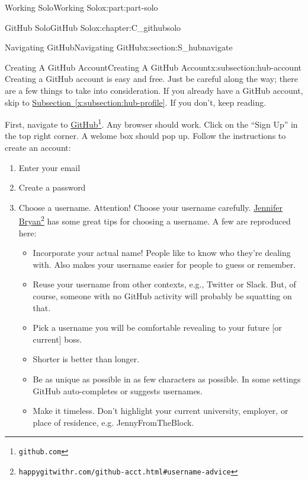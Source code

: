 \documentclass[oneside,10pt,]{book}
\newcommand{\xreffont}{\relax}
\begin{document}
\begin{partptx}{Working Solo}{}{Working Solo}{}{}{x:part:part-solo}
\begin{chapterptx}{GitHub Solo}{}{GitHub Solo}{}{}{x:chapter:C_githubsolo}
\begin{sectionptx}{Navigating GitHub}{}{Navigating GitHub}{}{}{x:section:S_hubnavigate}
\begin{introduction}{}
\end{introduction}%
%
%
\typeout{************************************************}
\typeout{************************************************}
%
\begin{subsectionptx}{Creating A GitHub Account}{}{Creating A GitHub Account}{}{}{x:subsection:hub-account}
%
%
Creating a GitHub account is easy and free. Just be careful along the way; there are a few things to take into consideration. If you already have a GitHub account, skip to \hyperref[x:subsection:hub-profile]{Subsection~{\xreffont\ref{x:subsection:hub-profile}}}. If you don't, keep reading.%
\par
First, navigate to \href{https://github.com}{GitHub}\footnote{\nolinkurl{github.com}\label{g:fn:idp615667736}}. Any browser should work. Click on the ``Sign Up'' in the top right corner. A welome box should pop up. Follow the instructions to create an account:%
\begin{enumerate}
\item{}Enter your email%
\item{}Create a password%
\item{}Choose a username. Attention! Choose your username carefully. \href{https://happygitwithr.com/github-acct.html\#username-advice}{Jennifer Bryan}\footnote{\nolinkurl{happygitwithr.com/github-acct.html\#username-advice}\label{g:fn:idp615676056}} has some great tips for choosing a username. A few are reproduced here:%
\begin{itemize}[label=\textbullet]
\item{}Incorporate your actual name! People like to know who they're dealing with. Also makes your username easier for people to guess or remember.%
\item{}Reuse your username from other contexts, e.g., Twitter or Slack. But, of course, someone with no GitHub activity will probably be squatting on that.%
\item{}Pick a username you will be comfortable revealing to your future [or current] boss.%
\item{}Shorter is better than longer.%
\item{}Be as unique as possible in as few characters as possible. In some settings GitHub auto-completes or suggests usernames.%
\item{}Make it timeless. Don't highlight your current university, employer, or place of residence, e.g. JennyFromTheBlock.%

\end{itemize}
\end{enumerate}
\end{subsectionptx}
\end{sectionptx}
\end{chapterptx}
\end{partptx}
\end{document}
